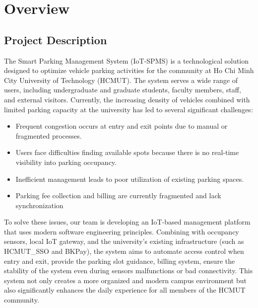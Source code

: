 \section{Overview}
\subsection{Project Description}
The Smart Parking Management System (IoT-SPMS) is a technological solution designed to optimize vehicle parking activities for the community at Ho Chi Minh City University of Technology (HCMUT). The system serves a wide range of users, including undergraduate and graduate students, faculty members, staff, and external visitors. Currently, the increasing density of vehicles combined with limited parking capacity at the university has led to several significant challenges:
\begin{itemize}
    \item Frequent congestion occurs at entry and exit points due to manual or fragmented processes.
    \item Users face difficulties finding available spots because there is no real-time visibility into parking occupancy.
    \item Inefficient management leads to poor utilization of existing parking spaces.
    \item Parking fee collection and billing are currently fragmented and lack synchronization
\end{itemize}

To solve these issues, our team is developing an IoT-based management platform that uses modern software engineering principles. Combining with occupancy sensors, local IoT gateway, and the university’s existing infrastructure (such as HCMUT\_SSO and BKPay), the system aims to automate access control when entry and exit, provide the parking slot guidance, billing system, ensure the stability of the system even during sensors malfunctions or bad connectivity. This system not only creates a more organized and modern campus environment but also significantly enhances the daily experience for all members of the HCMUT community.
